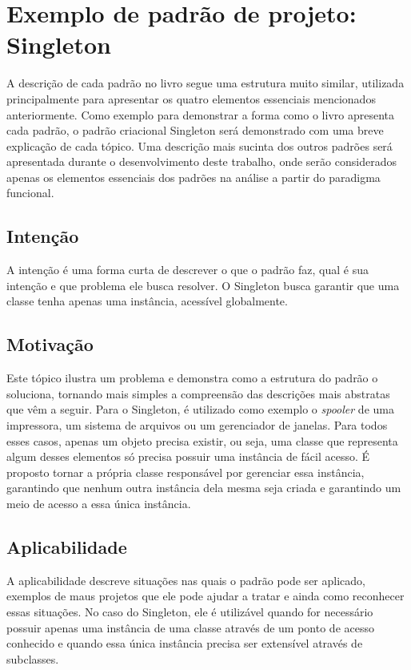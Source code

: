 \section{Exemplo de padrão de projeto: Singleton}

A descrição de cada padrão no livro segue uma estrutura 
muito similar, utilizada principalmente para apresentar 
os quatro elementos essenciais mencionados anteriormente. 
Como exemplo para demonstrar a forma como o livro 
apresenta cada padrão, o padrão criacional Singleton será 
demonstrado com uma breve explicação de cada tópico. 
Uma descrição mais sucinta dos outros padrões será 
apresentada durante o desenvolvimento deste 
trabalho, onde serão considerados apenas os elementos 
essenciais dos padrões na análise 
a partir do paradigma funcional.

\subsection*{Intenção}

A intenção é uma forma curta de descrever o que o padrão 
faz, qual é sua intenção e que problema ele busca resolver. 
O Singleton busca garantir que uma classe tenha apenas uma
instância, acessível globalmente.

\subsection*{Motivação}

Este tópico ilustra um problema e demonstra como a estrutura 
do padrão o soluciona, tornando mais simples a compreensão 
das descrições mais abstratas que vêm a seguir. Para o 
Singleton, é utilizado como exemplo o \textit{spooler} de uma 
impressora, um sistema de arquivos ou um gerenciador de 
janelas. Para todos esses casos, apenas um objeto precisa existir, 
ou seja, uma classe que representa algum desses elementos 
só precisa possuir uma instância de fácil acesso. É proposto 
tornar a própria classe responsável por gerenciar essa 
instância, garantindo que nenhum outra instância dela 
mesma seja criada e garantindo um meio de acesso a essa 
única instância.

\subsection*{Aplicabilidade}

A aplicabilidade descreve situações nas quais o padrão 
pode ser aplicado, exemplos de maus projetos que ele pode 
ajudar a tratar e ainda como reconhecer essas situações. 
No caso do Singleton, ele é utilizável quando for necessário 
possuir apenas uma instância de uma classe através de um 
ponto de acesso conhecido e quando essa única instância 
precisa ser extensível através de subclasses. 

